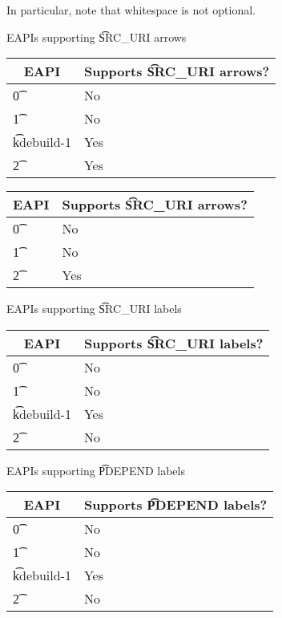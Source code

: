 In particular, note that whitespace is not optional.

\begin{centertable}{EAPIs supporting \t{SRC\_URI} arrows} \label{uri-arrows-table}
\IFKDEBUILDELSE
{
    \begin{tabular}{ l l }
        \toprule
        \multicolumn{1}{c}{\textbf{EAPI}} &
        \multicolumn{1}{c}{\textbf{Supports \t{SRC\_URI} arrows?}} \\
        \midrule
    \t{0} & No \\
    \t{1} & No \\
    \t{kdebuild-1} & Yes \\
    \t{2} & Yes \\
    \bottomrule
    \end{tabular}
}{
    \begin{tabular}{ l l }
        \toprule
        \multicolumn{1}{c}{\textbf{EAPI}} &
        \multicolumn{1}{c}{\textbf{Supports \t{SRC\_URI} arrows?}} \\
        \midrule
    \t{0} & No \\
    \t{1} & No \\
    \t{2} & Yes \\
    \bottomrule
    \end{tabular}
}
\end{centertable}

\IFKDEBUILDELSE
{
    \begin{centertable}{EAPIs supporting \t{SRC\_URI} labels} \label{uri-labels-table}
    \begin{tabular}{ l l }
        \toprule
        \multicolumn{1}{c}{\textbf{EAPI}} &
        \multicolumn{1}{c}{\textbf{Supports \t{SRC\_URI} labels?}} \\
        \midrule
    \t{0} & No \\
    \t{1} & No \\
    \t{kdebuild-1} & Yes \\
    \t{2} & No \\
    \bottomrule
    \end{tabular}
    \end{centertable}

    \begin{centertable}{EAPIs supporting \t{PDEPEND} labels} \label{pdepend-labels-table}
    \begin{tabular}{ l l }
        \toprule
        \multicolumn{1}{c}{\textbf{EAPI}} &
        \multicolumn{1}{c}{\textbf{Supports \t{PDEPEND} labels?}} \\
        \midrule
    \t{0} & No \\
    \t{1} & No \\
    \t{kdebuild-1} & Yes \\
    \t{2} & No \\
    \bottomrule
    \end{tabular}
    \end{centertable}
}{
}

